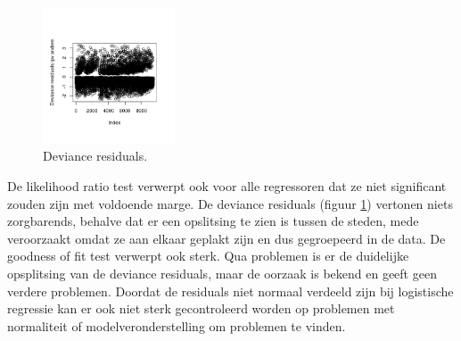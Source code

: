 \documentclass[a4paper,kulak]{kulakarticle} %
\begin{document}
\begin{figure}
	\begin{center}
		\includegraphics[width=0.35\textwidth]{Rplot.png}
	\end{center}
	\caption{Deviance residuals.}
	\label{fig:rpn}
\end{figure}
De likelihood ratio test verwerpt ook voor alle regressoren dat ze niet significant zouden zijn met voldoende marge.
De deviance residuals (figuur \ref{fig:rpn}) vertonen niets zorgbarends, behalve dat er een opslitsing te zien is tussen de steden, mede veroorzaakt omdat ze aan elkaar geplakt zijn en dus gegroepeerd in de data.
De goodness of fit test verwerpt ook sterk.
Qua problemen is er de duidelijke opsplitsing van de deviance residuals, maar de oorzaak is bekend en geeft geen verdere problemen.
Doordat de residuals niet normaal verdeeld zijn bij logistische regressie kan er ook niet sterk gecontroleerd worden op problemen met normaliteit of modelveronderstelling om problemen te vinden.
\end{document}
